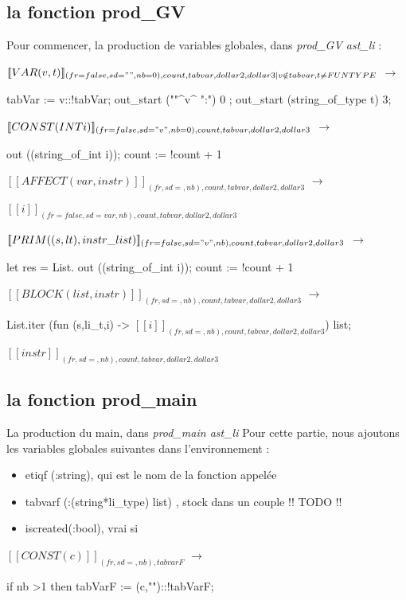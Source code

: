 \documentclass[a4paper, 11pt]{report}
\begin{document}
\subsection{la fonction prod\_GV}
Pour commencer, la production de variables globales, dans
\emph{prod\_GV ast\_li} :


 $[\![ VAR(v,t) ]\!]
_{(fr=false,sd="",nb=0),count,tabvar,dollar2,dollar3 | v\notin tabvar, t\neq FUNTYPE} $
$\longrightarrow$
\begin{OCaml}
tabVar := v::!tabVar;  
out_start ("\n"^v^ ":") 0 ;  
out_start (string_of_type t) 3; 
\end{OCaml}


 $[\![ CONST(INT i) ]\!]
_{(fr=false,sd="v",nb=0),count,tabvar,dollar2,dollar3} $
$\longrightarrow$
\begin{OCaml}
out ((string_of_int i));
count := !count + 1
\end{OCaml}


 $[\![ AFFECT(var, instr) ]\!]
_{(fr,sd=,nb),count,tabvar,dollar2,dollar3} $
$\longrightarrow$
\begin{center}
 $[\![ i ]\!]
_{(fr=false,sd=var,nb),count,tabvar,dollar2,dollar3} $
\end{center}

 $[\![ PRIM((s,lt),instr\_list) ]\!]
_{(fr=false,sd="v",nb),count,tabvar,dollar2,dollar3} $
$\longrightarrow$
\begin{OCaml}
let res = List.
out ((string_of_int i));
count := !count + 1
\end{OCaml}

 $[\![ BLOCK(list, instr) ]\!]
_{(fr,sd=,nb),count,tabvar,dollar2,dollar3} $
$\longrightarrow$
\begin{center}
List.iter (fun (s,li\_t,i) -> $[\![ i ]\!]
_{(fr,sd=,nb),count,tabvar,dollar2,dollar3} $) list;

$[\![ instr ]\!]
_{(fr,sd=,nb),count,tabvar,dollar2,dollar3} $
\end{center}

\subsection{la fonction prod\_main}
La production du main, dans \emph{prod\_main ast\_li}
Pour cette partie, nous ajoutons les variables globales suivantes dans
l'environnement :
\begin{itemize}
\item etiqf (:string), qui est le nom de la fonction appelée
\item tabvarf (:(string*li\_type) list)  , stock dans un couple !! TODO !!
\item iscreated(:bool), vrai si 
\end{itemize}
$[\![ CONST(c) ]\!]
_{(fr,sd=,nb),tabvarF} $
$\longrightarrow$
\begin{OCaml}
  if nb >1 then
  tabVarF := (c,"")::!tabVarF;
\end{OCaml}
     
\end{document}
